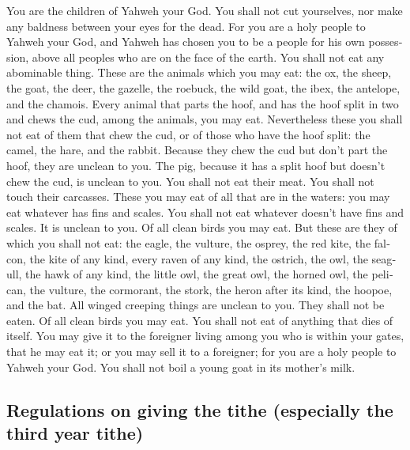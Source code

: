 \begin{paracol}{2}
\begin{otherlanguage}{english}
 You are the children of Yahweh your God. You shall not
cut yourselves, nor make any baldness between your eyes for the dead.
 For you are a holy people to Yahweh your God, and Yahweh
has chosen you to be a people for his own possession, above all peoples
who are on the face of the earth.  You shall not eat any
abominable thing.  These are the animals which you may
eat: the ox, the sheep, the goat,  the deer, the gazelle,
the roebuck, the wild goat, the ibex, the antelope, and the chamois.
 Every animal that parts the hoof, and has the hoof split
in two and chews the cud, among the animals, you may eat. 
Nevertheless these you shall not eat of them that chew the cud, or of
those who have the hoof split: the camel, the hare, and the rabbit.
Because they chew the cud but don't part the hoof, they are unclean to
you.  The pig, because it has a split hoof but doesn't
chew the cud, is unclean to you. You shall not eat their meat. You shall
not touch their carcasses.  These you may eat of all that
are in the waters: you may eat whatever has fins and scales.
 You shall not eat whatever doesn't have fins and scales.
It is unclean to you.  Of all clean birds you may eat.
 But these are they of which you shall not eat: the
eagle, the vulture, the osprey,  the red kite, the
falcon, the kite of any kind,  every raven of any kind,
 the ostrich, the owl, the seagull, the hawk of any kind,
 the little owl, the great owl, the horned owl,
 the pelican, the vulture, the cormorant, 
the stork, the heron after its kind, the hoopoe, and the bat.
 All winged creeping things are unclean to you. They
shall not be eaten.  Of all clean birds you may eat.
 You shall not eat of anything that dies of itself. You
may give it to the foreigner living among you who is within your gates,
that he may eat it; or you may sell it to a foreigner; for you are a
holy people to Yahweh your God. You shall not boil a young goat in its
mother's milk.

\hypertarget{regulations-on-giving-the-tithe-especially-the-third-year-tithe}{%
\subsection{Regulations on giving the tithe (especially the third year
tithe)}\label{regulations-on-giving-the-tithe-especially-the-third-year-tithe}}


\end{otherlanguage}
\end{paracol}
